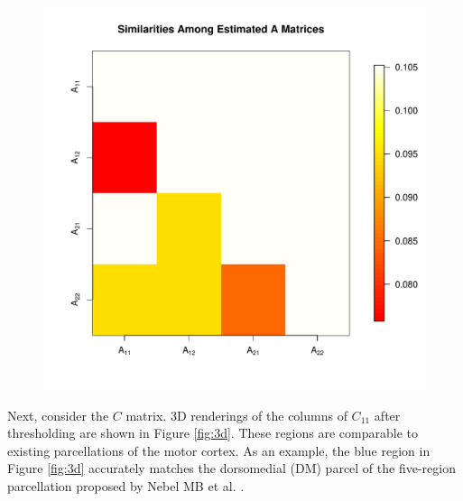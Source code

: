 \documentclass[times,twocolumn,final,authoryear]{elsarticle}
\let\oldref\ref
\renewcommand{\ref}[1]{(\oldref{#1})}
\begin{document}
\begin{figure}
\centering
\includegraphics[scale=.4]{../figures/A-matrices-similarity.pdf}
\label{fig:matsim}
\end{figure}

Next, consider the $C$ matrix. 3D renderings of the columns of $C_{11}$ after thresholding are shown in Figure \oldref{fig:3d}. These regions are comparable to existing parcellations of the motor cortex. As an example, the blue region in Figure \oldref{fig:3d} accurately matches the dorsomedial (DM) parcel of the five-region parcellation proposed by Nebel MB et al. \citep{nebel2014disruption}.
\end{document}
